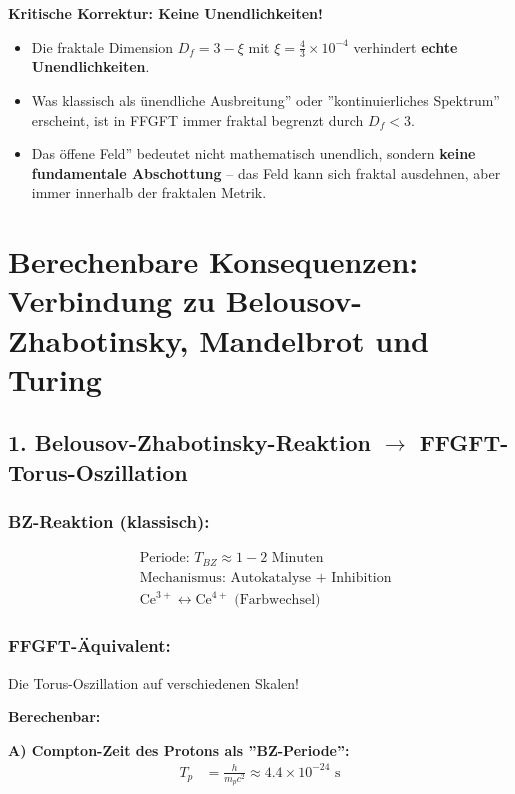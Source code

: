 	\textbf{Kritische Korrektur: Keine Unendlichkeiten!}
	\begin{itemize}[label=$\bullet$]
		\item Die fraktale Dimension $D_f = 3 - \xi$ mit $\xi = \frac{4}{3} \times 10^{-4}$ verhindert \textbf{echte Unendlichkeiten}.
		\item Was klassisch als ünendliche Ausbreitung'' oder ''kontinuierliches Spektrum'' erscheint, ist in FFGFT immer fraktal begrenzt durch $D_f < 3$.
		\item Das öffene Feld'' bedeutet nicht mathematisch unendlich, sondern \textbf{keine fundamentale Abschottung} – das Feld kann sich fraktal ausdehnen, aber immer innerhalb der fraktalen Metrik.
	\end{itemize}
	
	\section*{Berechenbare Konsequenzen: Verbindung zu Belousov-Zhabotinsky, Mandelbrot und Turing}
	
	\subsection*{1. Belousov-Zhabotinsky-Reaktion $\rightarrow$ FFGFT-Torus-Oszillation}
	
	\subsubsection*{BZ-Reaktion (klassisch):}
	\begin{align*}
		&\text{Periode: } T_{BZ} \approx 1-2 \text{ Minuten} \\
		&\text{Mechanismus: Autokatalyse + Inhibition} \\
		&\text{Ce}^{3+} \longleftrightarrow \text{Ce}^{4+} \text{ (Farbwechsel)}
	\end{align*}
	
	\subsubsection*{FFGFT-Äquivalent:}
	Die Torus-Oszillation auf verschiedenen Skalen!
	
	\textbf{Berechenbar:}
	
	\textbf{A) Compton-Zeit des Protons als ''BZ-Periode'':}
	\begin{align*}
		T_p &= \frac{h}{m_p c^2} \approx 4.4 \times 10^{-24} \text{ s}
	\end{align*}
	
